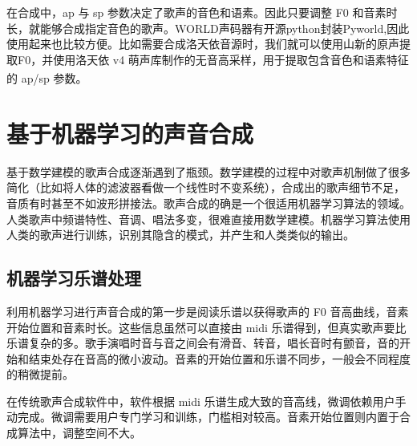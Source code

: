 \documentclass[12pt,a4paper]{ctexart}
\newcommand{\supercite}[1]{\textsuperscript{\cite{#1}}}
\begin{document}
在合成中，ap 与 sp 参数决定了歌声的音色和语素。因此只要调整 F0 和音素时长，就能够合成指定音色的歌声。WORLD声码器有开源python封装Pyworld,因此使用起来也比较方便。比如需要合成洛天依音源时，我们就可以使用山新的原声提取F0，并使用洛天依 v4 萌声库制作的无音高采样，用于提取包含音色和语素特征的 ap/sp 参数。\supercite{9}
\section{基于机器学习的声音合成}
基于数学建模的歌声合成逐渐遇到了瓶颈。数学建模的过程中对歌声机制做了很多简化（比如将人体的滤波器看做一个线性时不变系统），合成出的歌声细节不足，音质有时甚至不如波形拼接法。歌声合成的确是一个很适用机器学习算法的领域。人类歌声中频谱特性、音调、唱法多变，很难直接用数学建模。机器学习算法使用人类的歌声进行训练，识别其隐含的模式，并产生和人类类似的输出。
\subsection{机器学习乐谱处理}
利用机器学习进行声音合成的第一步是阅读乐谱以获得歌声的 F0 音高曲线，音素开始位置和音素时长。这些信息虽然可以直接由 midi 乐谱得到，但真实歌声要比乐谱复杂的多。歌手演唱时音与音之间会有滑音、转音，唱长音时有颤音，音的开始和结束处存在音高的微小波动。音素的开始位置和乐谱不同步，一般会不同程度的稍微提前。

在传统歌声合成软件中，软件根据 midi 乐谱生成大致的音高线，微调依赖用户手动完成。微调需要用户专门学习和训练，门槛相对较高。音素开始位置则内置于合成算法中，调整空间不大。
\end{document}
